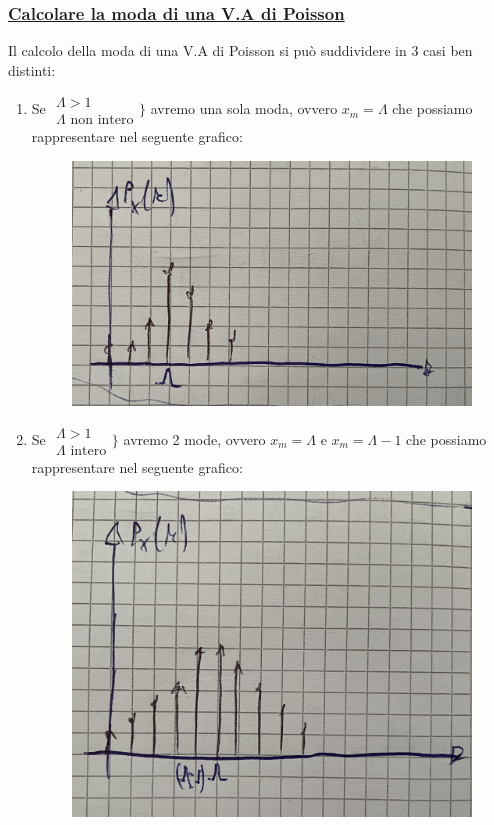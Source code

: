 \documentclass{article}
\begin{document}
\subsubsection{\underline{Calcolare la moda di una V.A di Poisson}}
Il calcolo della moda di una V.A di Poisson si può suddividere in 3 casi ben distinti:
\begin{enumerate}
    \item Se $\begin{matrix}
    \Lambda > 1 \\
    \Lambda \text{ non intero}
    \end{matrix}
    \Bigg\}$ avremo una sola moda, ovvero $x_m = \Lambda$ che possiamo rappresentare nel seguente grafico:
    \begin{figure}[ht]
    \centering
    \includegraphics[scale=0.10]{images/66.PoissDeltMaggNonInt.jpeg}
    \end{figure} 
    \item Se $\begin{matrix}
    \Lambda > 1 \\
    \Lambda \text{ intero}
    \end{matrix}
    \Bigg\}$ avremo 2 mode, ovvero $x_m = \Lambda$ e $x_m = \Lambda - 1$ che possiamo rappresentare nel seguente grafico:
    \begin{figure}[ht]
    \centering
    \includegraphics[scale=0.10]{images/67.PoissDeltMaggInt.jpeg}

\end{figure}
\end{enumerate}
\end{document}
